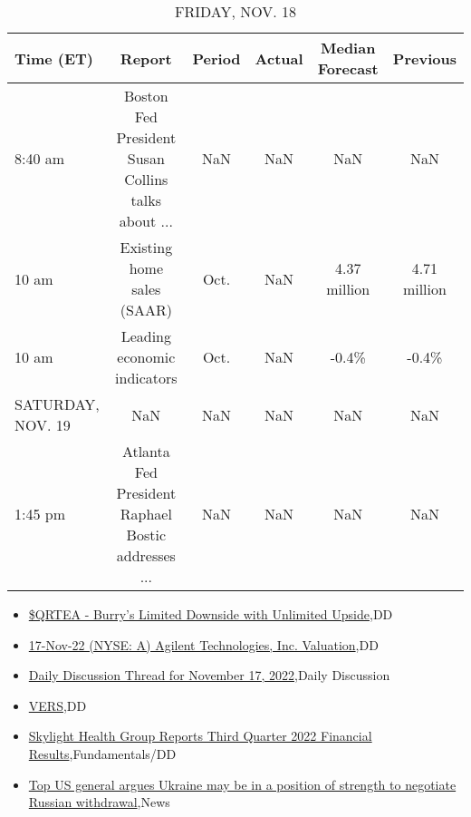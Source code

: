 \documentclass{article}%
\begin{document}
\begin{table}[htbp]%
\caption{FRIDAY, NOV. 18}%
\centering%
\begin{adjustbox}{width=1\textwidth}%
\begin{tabular}{lccccc}
\toprule
        Time (ET) &                                             Report & Period & Actual & Median Forecast &     Previous \\
\midrule
          8:40 am & Boston Fed President Susan Collins talks about ... &    NaN &    NaN &             NaN &          NaN \\
            10 am &                         Existing home sales (SAAR) &   Oct. &    NaN &    4.37 million & 4.71 million \\
            10 am &                        Leading economic indicators &   Oct. &    NaN &           -0.4\% &        -0.4\% \\
SATURDAY, NOV. 19 &                                                NaN &    NaN &    NaN &             NaN &          NaN \\
          1:45 pm & Atlanta Fed President Raphael Bostic addresses ... &    NaN &    NaN &             NaN &          NaN \\
\bottomrule
\end{tabular}
%
\end{adjustbox}%
\end{table}

%
\begin{itemize}%
\item%
\href{https://reddit.com/r/wallstreetbets/comments/yxozbt/qrtea\_burrys\_limited\_downside\_with\_unlimited/}{\$QRTEA - Burry's Limited Downside with Unlimited Upside},DD%
\item%
\href{https://reddit.com/r/wallstreetbets/comments/yxoxxk/17nov22\_nyse\_a\_agilent\_technologies\_inc\_valuation/}{17-Nov-22 (NYSE: A) Agilent Technologies, Inc. Valuation},DD%
\item%
\href{https://reddit.com/r/wallstreetbets/comments/yxnbwi/daily\_discussion\_thread\_for\_november\_17\_2022/}{Daily Discussion Thread for November 17, 2022},Daily Discussion%
\item%
\href{https://reddit.com/r/Baystreetbets/comments/yx8zi5/vers/}{VERS},DD%
\item%
\href{https://reddit.com/r/StockMarket/comments/yxow1k/skylight\_health\_group\_reports\_third\_quarter\_2022/}{Skylight Health Group Reports Third Quarter 2022 Financial Results},Fundamentals/DD%
\item%
\href{https://reddit.com/r/Economics/comments/yxm0g7/top\_us\_general\_argues\_ukraine\_may\_be\_in\_a/}{Top US general argues Ukraine may be in a position of strength to negotiate Russian withdrawal},News%
\end{itemize}%
\end{document}
